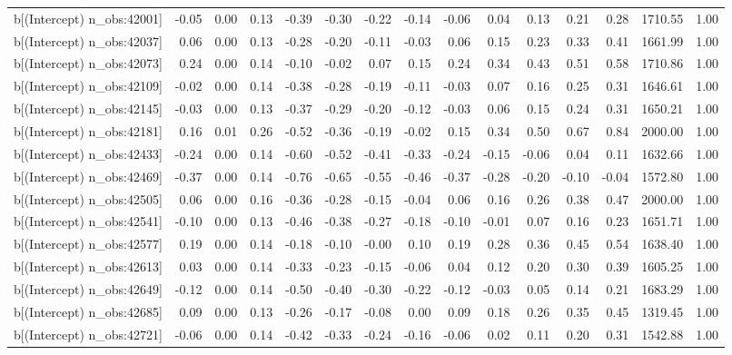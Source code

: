 \begin{table}[ht]
\begin{tabular}{rrrrrrrrrrrrrrr}
  b[(Intercept) n\_obs:42001] & -0.05 & 0.00 & 0.13 & -0.39 & -0.30 & -0.22 & -0.14 & -0.06 & 0.04 & 0.13 & 0.21 & 0.28 & 1710.55 & 1.00 \\ 
  b[(Intercept) n\_obs:42037] & 0.06 & 0.00 & 0.13 & -0.28 & -0.20 & -0.11 & -0.03 & 0.06 & 0.15 & 0.23 & 0.33 & 0.41 & 1661.99 & 1.00 \\ 
  b[(Intercept) n\_obs:42073] & 0.24 & 0.00 & 0.14 & -0.10 & -0.02 & 0.07 & 0.15 & 0.24 & 0.34 & 0.43 & 0.51 & 0.58 & 1710.86 & 1.00 \\ 
  b[(Intercept) n\_obs:42109] & -0.02 & 0.00 & 0.14 & -0.38 & -0.28 & -0.19 & -0.11 & -0.03 & 0.07 & 0.16 & 0.25 & 0.31 & 1646.61 & 1.00 \\ 
  b[(Intercept) n\_obs:42145] & -0.03 & 0.00 & 0.13 & -0.37 & -0.29 & -0.20 & -0.12 & -0.03 & 0.06 & 0.15 & 0.24 & 0.31 & 1650.21 & 1.00 \\ 
  b[(Intercept) n\_obs:42181] & 0.16 & 0.01 & 0.26 & -0.52 & -0.36 & -0.19 & -0.02 & 0.15 & 0.34 & 0.50 & 0.67 & 0.84 & 2000.00 & 1.00 \\ 
  b[(Intercept) n\_obs:42433] & -0.24 & 0.00 & 0.14 & -0.60 & -0.52 & -0.41 & -0.33 & -0.24 & -0.15 & -0.06 & 0.04 & 0.11 & 1632.66 & 1.00 \\ 
  b[(Intercept) n\_obs:42469] & -0.37 & 0.00 & 0.14 & -0.76 & -0.65 & -0.55 & -0.46 & -0.37 & -0.28 & -0.20 & -0.10 & -0.04 & 1572.80 & 1.00 \\ 
  b[(Intercept) n\_obs:42505] & 0.06 & 0.00 & 0.16 & -0.36 & -0.28 & -0.15 & -0.04 & 0.06 & 0.16 & 0.26 & 0.38 & 0.47 & 2000.00 & 1.00 \\ 
  b[(Intercept) n\_obs:42541] & -0.10 & 0.00 & 0.13 & -0.46 & -0.38 & -0.27 & -0.18 & -0.10 & -0.01 & 0.07 & 0.16 & 0.23 & 1651.71 & 1.00 \\ 
  b[(Intercept) n\_obs:42577] & 0.19 & 0.00 & 0.14 & -0.18 & -0.10 & -0.00 & 0.10 & 0.19 & 0.28 & 0.36 & 0.45 & 0.54 & 1638.40 & 1.00 \\ 
  b[(Intercept) n\_obs:42613] & 0.03 & 0.00 & 0.14 & -0.33 & -0.23 & -0.15 & -0.06 & 0.04 & 0.12 & 0.20 & 0.30 & 0.39 & 1605.25 & 1.00 \\ 
  b[(Intercept) n\_obs:42649] & -0.12 & 0.00 & 0.14 & -0.50 & -0.40 & -0.30 & -0.22 & -0.12 & -0.03 & 0.05 & 0.14 & 0.21 & 1683.29 & 1.00 \\ 
  b[(Intercept) n\_obs:42685] & 0.09 & 0.00 & 0.13 & -0.26 & -0.17 & -0.08 & 0.00 & 0.09 & 0.18 & 0.26 & 0.35 & 0.45 & 1319.45 & 1.00 \\ 
  b[(Intercept) n\_obs:42721] & -0.06 & 0.00 & 0.14 & -0.42 & -0.33 & -0.24 & -0.16 & -0.06 & 0.02 & 0.11 & 0.20 & 0.31 & 1542.88 & 1.00 \\ 

\end{tabular}
\end{table}
